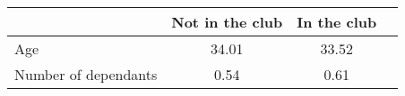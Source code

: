{
\def\sym#1{\ifmmode^{#1}\else\(^{#1}\)\fi}
\begin{tabular}{l*{3}{c}}
\toprule
 & Not in the club & In the club \\
\midrule
Age             &    34.01 & 33.52\\
Number of dependants &    0.54 & 0.61\\
\bottomrule
\end{tabular}
}
